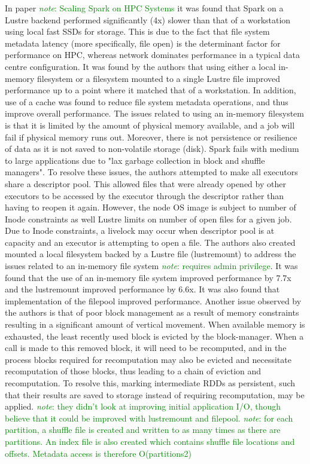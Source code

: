 \documentclass{report}
\newcommand{\note}[1]{\textcolor{green}{\textit{note}: #1}}
\begin{document}
	In paper \note{Scaling Spark on HPC Systems} it was found that Spark on a Lustre backend performed significantly (4x) slower than that of a workstation using local fast SSDs for storage. This is due to the fact that file system metadata latency (more specifically, file open) is the determinant factor for performance on HPC, whereas network dominates performance in a typical data centre configuration. It was found by the authors that using either a local in-memory filesystem or a filesystem mounted to a single Lustre file improved performance up to a point where it matched that of a workstation. In addition, use of a cache was found to reduce file system metadata operations, and thus improve overall performance. 
	The issues related to using an in-memory filesystem is that it is limited by the amount of physical memory available, and a job will fail if physical memory runs out. Moreover, there is not persistence or resilience of data as it is not saved to non-volatile storage (disk). Spark fails with medium to large applications due to "lax garbage collection in block and shuffle managers". To resolve these issues, the authors attempted to make all executors share a descriptor pool. This allowed files that were already opened by other executors to be accessed by the executor through the descriptor rather than having to reopen it again. However, the node OS image is subject to number of Inode constraints as well Lustre limits on number of open files for a given job. Due to Inode constraints, a livelock may occur when descriptor pool is at capacity and an executor is attempting to open a file. The authors also created mounted a local filesystem backed by a Lustre file (lustremount) to address the issues related to an in-memory file system \note{requires admin privilege}. It was found that the use of an in-memory file system improved performance by 7.7x and the lustremount improved performance by 6.6x. It was also found that implementation of the filepool improved performance.
	Another issue observed by the authors is that of poor block management as a result of memory constraints resulting in a significant amount of vertical movement. When available memory is exhausted, the least recently used block is evicted by the block-manager. When a call is made to this removed block, it will need to be recomputed, and in the process blocks required for recomputation may also be evicted and necessitate recomputation of those blocks, thus leading to a chain of eviction and recomputation. To resolve this, marking intermediate RDDs as persistent, such that their results are saved to storage instead of requiring recomputation, may be applied.
	\note{they didn't look at improving initial application I/O, though believe that it could be improved with lustremount and filepool. }
	\note{for each partition, a shuffle file is created and written to as many times as there are partitions. An index file is also created which contains shuffle file locations and offsets. Metadata access is therefore O(partitions2)}
	
\end{document}
